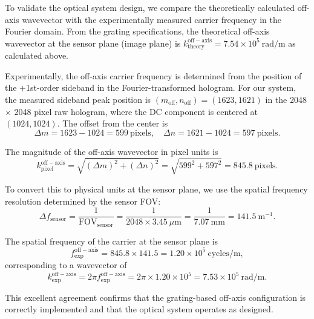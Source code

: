 To validate the optical system design, we compare the theoretically calculated off-axis wavevector with the experimentally measured carrier frequency in the Fourier domain. From the grating specifications, the theoretical off-axis wavevector at the sensor plane (image plane) is $k_{\mathrm{theory}}^{\mathrm{off-axis}} = 7.54 \times 10^5~\mathrm{rad/m}$ as calculated above.

Experimentally, the off-axis carrier frequency is determined from the position of the +1st-order sideband in the Fourier-transformed hologram. For our system, the measured sideband peak position is $(m_{\mathrm{off}}, n_{\mathrm{off}}) = (1623, 1621)$ in the 2048 × 2048 pixel raw hologram, where the DC component is centered at $(1024, 1024)$. The offset from the center is
\begin{equation}
\Delta m = 1623 - 1024 = 599~\mathrm{pixels}, \quad \Delta n = 1621 - 1024 = 597~\mathrm{pixels}.
\end{equation}

The magnitude of the off-axis wavevector in pixel units is
\begin{equation}
k_{\mathrm{pixel}}^{\mathrm{off-axis}} = \sqrt{(\Delta m)^2 + (\Delta n)^2} = \sqrt{599^2 + 597^2} = 845.8~\mathrm{pixels}.
\end{equation}

To convert this to physical units at the sensor plane, we use the spatial frequency resolution determined by the sensor FOV:
\begin{equation}
\Delta f_{\mathrm{sensor}} = \frac{1}{\mathrm{FOV}_{\mathrm{sensor}}} = \frac{1}{2048 \times 3.45~\mu\mathrm{m}} = \frac{1}{7.07~\mathrm{mm}} = 141.5~\mathrm{m}^{-1}.
\end{equation}

The spatial frequency of the carrier at the sensor plane is
\begin{equation}
f_{\mathrm{exp}}^{\mathrm{off-axis}} = 845.8 \times 141.5 = 1.20 \times 10^5~\mathrm{cycles/m},
\end{equation}
corresponding to a wavevector of
\begin{equation}
k_{\mathrm{exp}}^{\mathrm{off-axis}} = 2\pi f_{\mathrm{exp}}^{\mathrm{off-axis}} = 2\pi \times 1.20 \times 10^5 = 7.53 \times 10^5~\mathrm{rad/m}.
\end{equation}

This excellent agreement confirms that the grating-based off-axis configuration is correctly implemented and that the optical system operates as designed.


